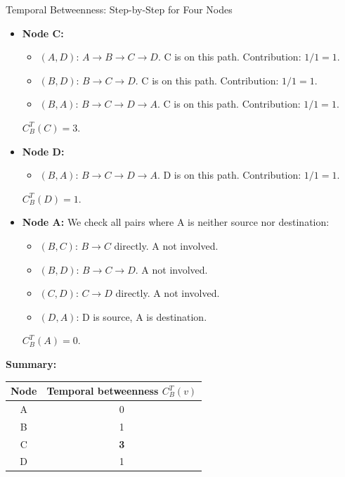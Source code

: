 \begin{examplebox}{Temporal Betweenness: Step-by-Step for Four Nodes}
\begin{itemize}
  \item \textbf{Node C:}
    \begin{itemize}[noitemsep]
      \item $(A,D)$: $A \to B \to C \to D$. C is on this path. Contribution: $1/1 = 1$.
      \item $(B,D)$: $B \to C \to D$. C is on this path. Contribution: $1/1 = 1$.
      \item $(B,A)$: $B \to C \to D \to A$. C is on this path. Contribution: $1/1 = 1$.
    \end{itemize}
    $C_B^T(C) = 3$.

  \item \textbf{Node D:}
    \begin{itemize}[noitemsep]
      \item $(B,A)$: $B \to C \to D \to A$. D is on this path. Contribution: $1/1 = 1$.
    \end{itemize}
    $C_B^T(D) = 1$.

  \item \textbf{Node A:} We check all pairs where A is neither source nor destination:
    \begin{itemize}[noitemsep]
      \item $(B,C)$: $B \to C$ directly. A not involved.
      \item $(B,D)$: $B \to C \to D$. A not involved.
      \item $(C,D)$: $C \to D$ directly. A not involved.
      \item $(D,A)$: D is source, A is destination.
    \end{itemize}
    $C_B^T(A) = 0$.
\end{itemize}

\medskip
\noindent\textbf{Summary:}
\begin{center}
\begin{tabular}{cc}
\toprule
\textbf{Node} & \textbf{Temporal betweenness $C_B^T(v)$} \\
\midrule
A & 0 \\
B & 1 \\
C & \textbf{3} \\
D & 1 \\
\bottomrule
\end{tabular}
\end{center}
\end{examplebox}


